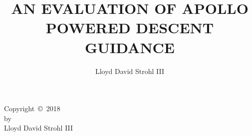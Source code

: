 \documentclass{sdsu-thesis}
\author{Lloyd David Strohl III}
\title{AN EVALUATION OF APOLLO \\
  POWERED DESCENT GUIDANCE }
\theoremstyle{dtm}
\begin{document}
\maketitle

\makesignature

\begin{copyrightpage}
  Copyright~\copyright~2018 \\
  by \\
  Lloyd David Strohl III
\end{copyrightpage}



\begin{abstract}
  
\end{abstract}

\tableofcontents

\listoftables

\listoffigures
\end{document}
